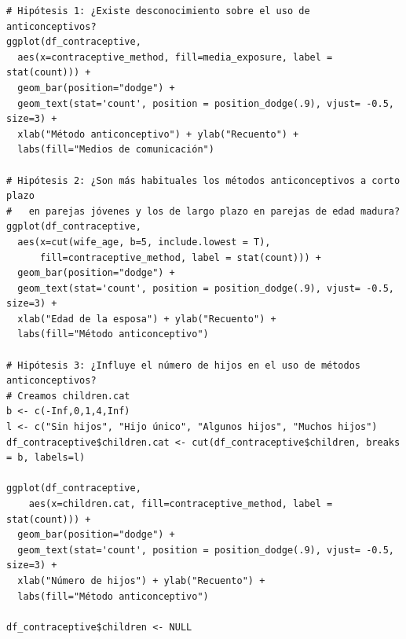 \documentclass[a4paper,12pt, oneside]{book}
\begin{document}
\begin{verbatim}
# Hipótesis 1: ¿Existe desconocimiento sobre el uso de anticonceptivos?
ggplot(df_contraceptive, 
  aes(x=contraceptive_method, fill=media_exposure, label = stat(count))) + 
  geom_bar(position="dodge") + 
  geom_text(stat='count', position = position_dodge(.9), vjust= -0.5, size=3) + 
  xlab("Método anticonceptivo") + ylab("Recuento") + 
  labs(fill="Medios de comunicación")

# Hipótesis 2: ¿Son más habituales los métodos anticonceptivos a corto plazo 
#   en parejas jóvenes y los de largo plazo en parejas de edad madura?
ggplot(df_contraceptive, 
  aes(x=cut(wife_age, b=5, include.lowest = T),
      fill=contraceptive_method, label = stat(count))) + 
  geom_bar(position="dodge") + 
  geom_text(stat='count', position = position_dodge(.9), vjust= -0.5, size=3) +
  xlab("Edad de la esposa") + ylab("Recuento") + 
  labs(fill="Método anticonceptivo")

# Hipótesis 3: ¿Influye el número de hijos en el uso de métodos anticonceptivos?
# Creamos children.cat
b <- c(-Inf,0,1,4,Inf)
l <- c("Sin hijos", "Hijo único", "Algunos hijos", "Muchos hijos")
df_contraceptive$children.cat <- cut(df_contraceptive$children, breaks = b, labels=l)

ggplot(df_contraceptive, 
	aes(x=children.cat, fill=contraceptive_method, label = stat(count))) + 
  geom_bar(position="dodge") + 
  geom_text(stat='count', position = position_dodge(.9), vjust= -0.5, size=3) + 
  xlab("Número de hijos") + ylab("Recuento") + 
  labs(fill="Método anticonceptivo")

df_contraceptive$children <- NULL

\end{verbatim}
\end{document}
